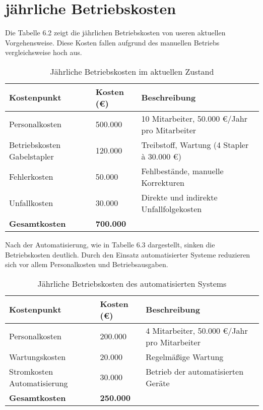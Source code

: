 \section{jährliche Betriebskosten}
Die Tabelle 6.2 zeigt die jährlichen Betriebskosten von useren aktuellen Vorgehensweise. Diese Kosten fallen aufgrund des manuellen Betriebs vergleichsweise hoch aus.

\begin{table}[H]
	\centering
	\begin{tabular}{|p{8cm}|p{4cm}|p{5cm}|}
		\hline
		\textbf{Kostenpunkt} & \textbf{Kosten (€)} & \textbf{Beschreibung} \\
		\hline
		Personalkosten  & 500.000 & 10 Mitarbeiter, 50.000 €/Jahr pro Mitarbeiter \\
		\hline
		Betriebskosten Gabelstapler & 120.000 & Treibstoff, Wartung (4 Stapler à 30.000 €) \\
		\hline
		Fehlerkosten & 50.000 & Fehlbestände, manuelle Korrekturen \\
		\hline
		Unfallkosten & 30.000 & Direkte und indirekte Unfallfolgekosten \\
		\hline
		\textbf{Gesamtkosten} & \textbf{700.000} & \\
		\hline
	\end{tabular}
	\caption{Jährliche Betriebskosten im aktuellen Zustand}
\end{table}
Nach der Automatisierung, wie in Tabelle 6.3 dargestellt, sinken die Betriebskosten deutlich. Durch den Einsatz automatisierter Systeme reduzieren sich vor allem Personalkosten und Betriebsausgaben.

\begin{table}[H]
	\centering
	\begin{tabular}{|p{8cm}|p{4cm}|p{5cm}|}
		\hline
		\textbf{Kostenpunkt} & \textbf{Kosten (€)} & \textbf{Beschreibung} \\
		\hline
		Personalkosten & 200.000 & 4 Mitarbeiter, 50.000 €/Jahr pro Mitarbeiter \\
		\hline
		Wartungskosten  & 20.000 & Regelmäßige Wartung \\
		\hline
		Stromkosten Automatisierung & 30.000 & Betrieb der automatisierten Geräte \\
		\hline
		\textbf{Gesamtkosten} & \textbf{250.000} & \\
		\hline
	\end{tabular}
	\caption{Jährliche Betriebskosten des automatisierten Systems}
\end{table}

